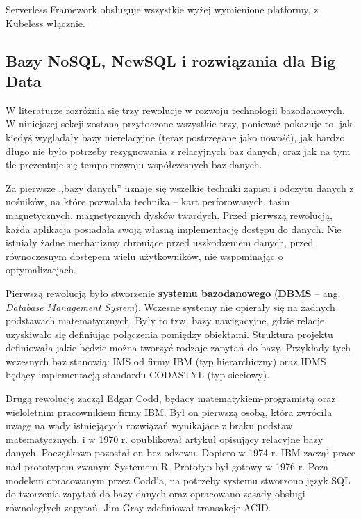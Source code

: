 \documentclass[12pt,a4paper,twoside,titlepage,openright]{book}
\begin{document}
Serverless Framework obsługuje wszystkie wyżej wymienione platformy, z Kubeless włącznie.\cite{siteServerlessFramework}


\subsection{Bazy NoSQL, NewSQL i rozwiązania dla Big Data} \label{section:nosql}

W literaturze rozróżnia się trzy rewolucje w rozwoju technologii bazodanowych.  \cite{noSqlHistory} W niniejszej sekcji zostaną przytoczone wszystkie trzy, ponieważ pokazuje to, jak kiedyś wyglądały bazy nierelacyjne (teraz postrzegane jako nowość), jak bardzo długo nie było potrzeby rezygnowania z relacyjnych baz danych, oraz jak na tym tle prezentuje się tempo rozwoju współczesnych baz danych.

Za pierwsze ,,bazy danych'' uznaje się wszelkie techniki zapisu i odczytu danych z nośników, na które pozwalała technika -- kart perforowanych, taśm magnetycznych, magnetycznych dysków twardych. Przed pierwszą rewolucją, każda aplikacja posiadała swoją własną implementację dostępu do danych. Nie istniały żadne mechanizmy chroniące przed uszkodzeniem danych, przed równoczesnym dostępem wielu użytkowników, nie wspominając o optymalizacjach. 

Pierwszą rewolucją było stworzenie \textbf{systemu bazodanowego} (\textbf{DBMS} -- ang. \textit{Database Management System}). Wczesne systemy nie opierały się na żadnych podstawach matematycznych. Były to tzw. bazy nawigacyjne, gdzie relacje uzyskiwało się definiując połączenia pomiędzy obiektami. Struktura projektu definiowała jakie będzie można tworzyć rodzaje zapytań do bazy. Przykłady tych wczesnych baz stanowią: IMS od firmy IBM (typ hierarchiczny) oraz IDMS będący implementacją standardu CODASTYL (typ sieciowy). 

Drugą rewolucję zaczął Edgar Codd, będący matematykiem-programistą oraz wieloletnim pracownikiem firmy IBM. Był on pierwszą osobą, która zwróciła uwagę na wady istniejących rozwiązań wynikające z braku podstaw matematycznych, i w 1970 r. opublikował artykuł opisujący relacyjne bazy danych. Początkowo pozostał on bez odzewu. Dopiero w 1974 r. IBM zaczął prace nad prototypem zwanym Systemem R. Prototyp był gotowy w 1976 r. Poza modelem opracowanym przez Codd'a, na potrzeby systemu stworzono język SQL do tworzenia zapytań do bazy danych oraz opracowano zasady obsługi równoległych zapytań. Jim Gray zdefiniował transakcje ACID.
\end{document}
